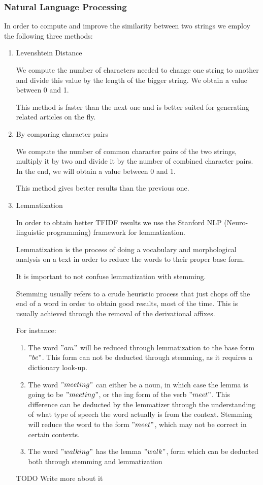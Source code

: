 \subsubsection{Natural Language Processing}
\label{sec:natural-language-processing}
In order to compute and improve the similarity between two strings we employ the following three methods:
\begin{enumerate}
	\item Levenshtein Distance

		We compute the number of characters needed to change one string to another and divide this value by the length of the bigger string. We obtain a value between 0 and 1.
		
		This method is faster than the next one and is better suited for generating related articles on the fly.

	\item By comparing character pairs
	
		We compute the number of common character pairs of the two strings, multiply it by two and divide it by the number of combined character pairs. In the end, we will obtain a value between 0 and 1.
		
		This method gives better results than the previous one.
	\item Lemmatization
		
		In order to obtain better TFIDF results we use the Stanford NLP (Neuro-linguistic programming) framework for lemmatization.

		Lemmatization is the process of doing a vocabulary and morphological analysis on a text in order to reduce the words to their proper base form.

		It is important to not confuse lemmatization with stemming.

		Stemming usually refers to a crude heuristic process that just chops off the end of a word in order to obtain good results, most of the time. This is usually achieved through the removal of the derivational affixes.

		For instance:
		\begin{enumerate}
			\item The word $"am"$ will be reduced through lemmatization to the base form $"be"$. This form can not be deducted through stemming, as it requires a dictionary look-up.
			\item The word $"meeting"$ can either be a noun, in which case the lemma is going to be $"meeting"$, or the ing form of the verb $"meet"$. This difference can be deducted by the lemmatizer through the understanding of what type of speech the word actually is from the context. Stemming will reduce the word to the form $"meet"$, which may not be correct in certain contexts.
			\item The word $"walking"$ has the lemma $"walk"$, form which can be deducted both through stemming and lemmatization

		\end{enumerate}

		
		
		TODO Write more about it
\end{enumerate}

